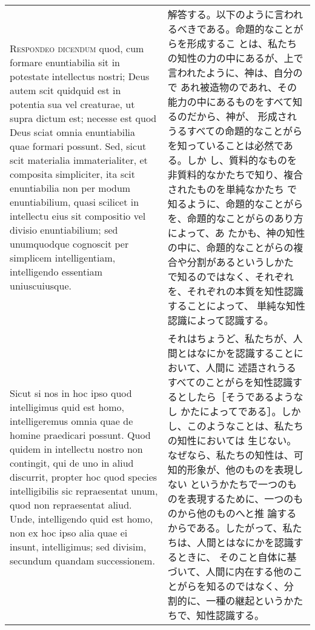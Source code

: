 \documentclass[10pt]{jsarticle} %
\begin{document}
\begin{longtable}{p{21em}p{21em}}
\\


{\scshape Respondeo dicendum} quod, cum formare
enuntiabilia sit in potestate intellectus nostri; Deus autem scit
quidquid est in potentia sua vel creaturae, ut supra dictum est; necesse
est quod Deus sciat omnia enuntiabilia quae formari possunt. Sed, sicut
scit materialia immaterialiter, et composita simpliciter, ita scit
enuntiabilia non per modum enuntiabilium, quasi scilicet in intellectu
eius sit compositio vel divisio enuntiabilium; sed unumquodque cognoscit
per simplicem intelligentiam, intelligendo essentiam
uniuscuiusque. 

&

解答する。以下のように言われるべきである。命題的なことがらを形成するこ
とは、私たちの知性の力の中にあるが、上で言われたように、神は、自分ので
あれ被造物のであれ、その能力の中にあるものをすべて知るのだから、神が、
形成されうるすべての命題的なことがらを知っていることは必然である。しか
し、質料的なものを非質料的なかたちで知り、複合されたものを単純なかたち
で知るように、命題的なことがらを、命題的なことがらのあり方によって、あ
たかも、神の知性の中に、命題的なことがらの複合や分割があるというしかた
で知るのではなく、それぞれを、それぞれの本質を知性認識することによって、
単純な知性認識によって認識する。

\\


Sicut si nos in hoc ipso quod intelligimus quid est homo,
intelligeremus omnia quae de homine praedicari possunt. Quod quidem in
intellectu nostro non contingit, qui de uno in aliud discurrit, propter
hoc quod species intelligibilis sic repraesentat unum, quod non
repraesentat aliud. Unde, intelligendo quid est homo, non ex hoc ipso
alia quae ei insunt, intelligimus; sed divisim, secundum quandam
successionem. 



&

それはちょうど、私たちが、人間とはなにかを認識することにおいて、人間に
述語されうるすべてのことがらを知性認識するとしたら［そうであるようなし
かたによってである］。しかし、このようなことは、私たちの知性においては
生じない。なぜなら、私たちの知性は、可知的形象が、他のものを表現しない
というかたちで一つのものを表現するために、一つのものから他のものへと推
論するからである。したがって、私たちは、人間とはなにかを認識するときに、
そのこと自体に基づいて、人間に内在する他のことがらを知るのではなく、分
割的に、一種の継起というかたちで、知性認識する。

\\



\end{longtable}
\end{document}
